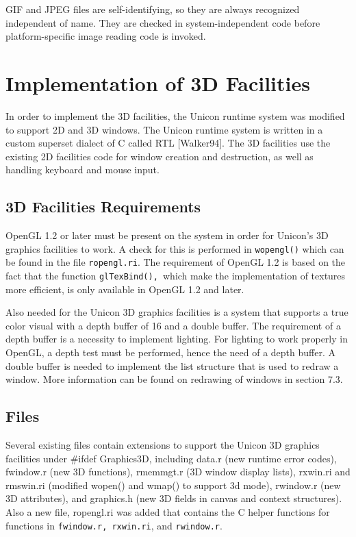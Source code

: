 GIF and JPEG files are self-identifying, so they are always recognized
independent of name. They are checked in system-independent code
before platform-specific image reading code is invoked.


\section{Implementation of 3D Facilities}

In order to implement the 3D facilities, the Unicon runtime system was
modified to support 2D and 3D windows. The Unicon runtime system is
written in a custom superset dialect of C called RTL [Walker94]. The
3D facilities use the existing 2D facilities code for window creation
and destruction, as well as handling keyboard and mouse input.

\subsection{3D Facilities Requirements}

OpenGL 1.2 or later must be present on the system in order for
Unicon's 3D graphics facilities to work. A check for this is performed
in \texttt{wopengl()} which can be found in the file
\texttt{ropengl.ri}. The requirement of OpenGL 1.2 is based on the
fact that the function \texttt{glTexBind(),}\texttt{ }which make the
implementation of textures more efficient, is only available in OpenGL
1.2 and later.

Also needed for the Unicon 3D graphics facilities is a system that
supports a true color visual with a depth buffer of 16 and a double
buffer. The requirement of a depth buffer is a necessity to implement
lighting. For lighting to work properly in OpenGL, a depth test must
be performed, hence the need of a depth buffer. A double buffer is
needed to implement the list structure that is used to redraw a
window. More information can be found on redrawing of windows in
section 7.3.

\subsection{Files}

Several existing files contain extensions to support the Unicon 3D
graphics facilities under \#ifdef Graphics3D, including data.r (new
runtime error codes), fwindow.r (new 3D functions), rmemmgt.r (3D
window display lists), rxwin.ri and rmswin.ri (modified wopen() and
wmap() to support 3d mode), rwindow.r (new 3D attributes), and
graphics.h (new 3D fields in canvas and context structures). Also a
new file, ropengl.ri was added that contains the C helper functions
for functions in \texttt{fwindow.r, rxwin.ri}, and \texttt{rwindow.r}.

